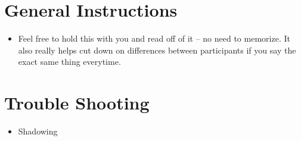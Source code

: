 \documentclass[11pt,twoside,letterpaper]{article}
\begin{document}
\section*{General Instructions}
\begin{itemize}
	\item Feel free to hold this with you and read off of it -- no need to memorize. It also really helps cut down on differences between participants if you say the exact same thing everytime.
\end{itemize}
\section*{Trouble Shooting}
\begin{itemize}
	\item Shadowing
\end{itemize}
\end{document}
